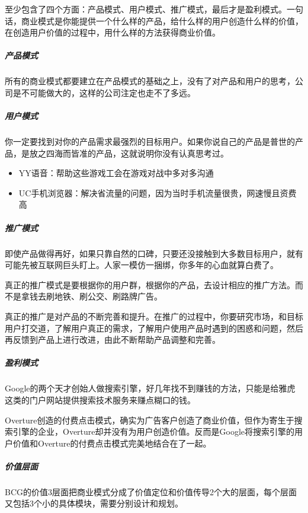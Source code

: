 \documentclass[letterpaper,11pt,english]{sphinxmanual}
\begin{document}
至少包含了四个方面：产品模式、用户模式、推广模式，最后才是盈利模式。一句话，商业模式是你能提供一个什么样的产品，给什么样的用户创造什么样的价值，在创造用户价值的过程中，用什么样的方法获得商业价值。


\subparagraph{产品模式}
\label{\detokenize{chapter_idea/business:id8}}
所有的商业模式都要建立在产品模式的基础之上，没有了对产品和用户的思考，公司是不可能做大的，这样的公司注定也走不了多远。


\subparagraph{用户模式}
\label{\detokenize{chapter_idea/business:id9}}
你一定要找到对你的产品需求最强烈的目标用户。如果你说自己的产品是普世的产品，是放之四海而皆准的产品，这就说明你没有认真思考过。
\begin{itemize}
\item {} 
YY语音：帮助这些游戏工会在游戏对战中多对多沟通

\item {} 
UC手机浏览器：解决省流量的问题，因为当时手机流量很贵，网速慢且资费高

\end{itemize}


\subparagraph{推广模式}
\label{\detokenize{chapter_idea/business:id10}}
即使产品做得再好，如果只靠自然的口碑，只要还没接触到大多数目标用户，就有可能先被互联网巨头盯上。人家一模仿一捆绑，你多年的心血就算白费了。

真正的推广模式是要根据你的用户群，根据你的产品，去设计相应的推广方法。而不是拿钱去刷地铁、刷公交、刷路牌广告。

真正的推广是对产品的不断完善和提升。在推广的过程中，你要研究市场，和目标用户打交道，了解用户真正的需求，了解用户使用产品时遇到的困惑和问题，然后再反馈到产品上进行改进，由此不断帮助产品调整和完善。


\subparagraph{盈利模式}
\label{\detokenize{chapter_idea/business:id11}}
Google的两个天才创始人做搜索引擎，好几年找不到赚钱的方法，只能是给雅虎这类的门户网站提供搜索技术服务来赚点糊口的钱。

Overture创造的付费点击模式，确实为广告客户创造了商业价值，但作为寄生于搜索引擎的企业，Overture却并没有为用户创造价值。反而是Google将搜索引擎的用户价值和Overture的付费点击模式完美地结合在了一起。


\subparagraph{价值层面}
\label{\detokenize{chapter_idea/business:id12}}
BCG的价值3层面把商业模式分成了价值定位和价值传导2个大的层面，每个层面又包括3个小的具体模块，需要分别设计和规划。
%
\begin{footnote}[125]\sphinxAtStartFootnote
{}
%
\end{footnote}
\end{document}
